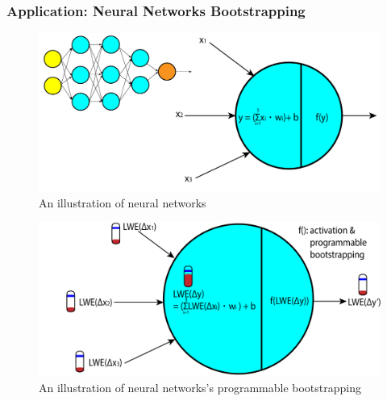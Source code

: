 \subsubsection{Application: Neural Networks Bootstrapping}
\label{subsec:tfhe-neural-network}

\begin{figure}[h!]
    \centering
  \includegraphics[width=0.8\linewidth]{figures/neural-network.pdf}
  \caption{An illustration of neural networks }
  \label{fig:neural-network}
\end{figure}

\begin{figure}[h!]
    \centering
  \includegraphics[width=0.8\linewidth]{figures/nn-homomorphic.pdf}
  \caption{An illustration of neural networks's programmable bootstrapping}
  \label{fig:neural-network2}
\end{figure}
